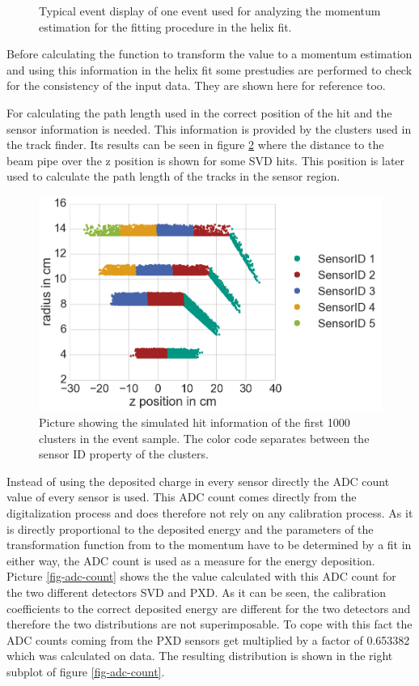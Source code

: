 \begin{figure}
 \centering
 \caption{Typical event display of one event used for analyzing the momentum estimation for the fitting procedure in the helix fit.}
 \label{fig-vxd-event-display}
\end{figure}

Before calculating the function to transform the \dedx value to a momentum estimation and using this information in the helix fit some prestudies are performed to check for the consistency of the input data. They are shown here for reference too.

For calculating the path length used in \dedx the correct position of the hit and the sensor information is needed. This information is provided by the clusters used in the track finder. Its results can be seen in figure \ref{fig-cluster-position} where the distance to the beam pipe over the z position is shown for some SVD hits. This position is later used to calculate the path length of the tracks in the sensor region.

\begin{figure}
 \centering
 \includegraphics[width=0.8\linewidth]{figures/vxd/cluster_positions.png}
 \caption{Picture showing the simulated hit information of the first 1000 clusters in the event sample. The color code separates between the sensor ID property of the clusters.}
 \label{fig-cluster-position}
\end{figure}

Instead of using the deposited charge in every sensor directly the ADC count value of every sensor is used. This ADC count comes directly from the digitalization process and does therefore not rely on any calibration process. As it is directly proportional to the deposited energy and the parameters of the transformation function from \dedx to the momentum have to be determined by a fit in either way, the ADC count is used as a measure for the energy deposition. Picture \ref{fig-adc-count} shows the the \dedx value calculated with this ADC count for the two different detectors SVD and PXD. As it can be seen, the calibration coefficients to the correct deposited energy are different for the two detectors and therefore the two distributions are not superimposable. To cope with this fact the ADC counts coming from the PXD sensors get multiplied by a factor of 0.653382 which was calculated on data. The resulting distribution is shown in the right subplot of figure \ref{fig-adc-count}.

